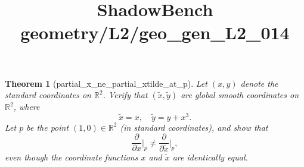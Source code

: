 \documentclass{article}
\title{ShadowBench geometry/L2/geo\_gen\_L2\_014}
\newtheorem{theorem}{Theorem}
\begin{document}
\maketitle

\begin{theorem}[partial_x_ne_partial_xtilde_at_p]
Let $(x,y)$ denote the standard coordinates on $\mathbb{R}^2$. Verify that $(\tilde{x}, \tilde{y})$ are global smooth coordinates on $\mathbb{R}^2$, where
\[ \tilde{x} = x, \quad \tilde{y} = y + x^3. \]
Let $p$ be the point $(1,0) \in \mathbb{R}^2$ (in standard coordinates), and show that
\[ \frac{\partial}{\partial x}\bigg|_p \neq \frac{\partial}{\partial \tilde{x}}\bigg|_p, \]
even though the coordinate functions $x$ and $\tilde{x}$ are identically equal.
\end{theorem}
\end{document}
